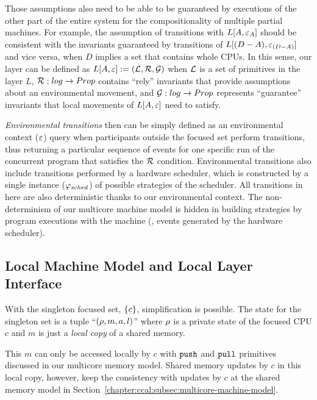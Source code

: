 Those assumptions  also need to be able to be guaranteed by executions of the other part of the entire system for 
the compositionality of multiple partial machines.
For example, the assumption of transitions with $L[A, {\varepsilon}_{A}]$ should be consistent with the invariants guaranteed by transitions of $L[(D - A), {\varepsilon}_{(D-A)}]$ and vice versa, when $D$ implies a set that contains whole CPUs.
In this sense, our layer can be defined as
$L[A, {\varepsilon}] := (\mathcal{L}, \mathcal{R},\mathcal{G})$ when $\mathcal{L}$ is a set of primitives in the layer $L$,
$\mathcal{R} : log \rightarrow Prop$ contains  ``rely'' invariants that provide assumptions about an environmental movement,
and $\mathcal{G}: log \rightarrow Prop$ represents ``guarantee'' invariants that local movements of $L[A, {\varepsilon}]$ need to satisfy.

\emph{Environmental transitions} then can be simply defined as 
an environmental context (${\varepsilon}$) query when participants outside  the focused set perform transitions,
thus returning a particular sequence of events for one specific run of the concurrent program 
that satisfies the $\mathcal{R}$ condition.
Environmental transitions also include  transitions performed by 
a hardware scheduler, which is constructed by 
a single instance ($\varphi_{sched}$) of possible strategies of the scheduler.
All transitions in here are also deterministic thanks to our environmental context.
The non-determinism of our multicore machine model is hidden in building strategies by
program executions with the machine (\eg, events generated by the hardware scheduler).

\subsection{Local Machine Model and Local Layer Interface}
\label{chapter:ccal:subsec:local-layer-interface}

With the singleton focused set, $\{c\}$, 
simplification is possible.
The state for the singleton set is a tuple ``$(\rho, m, a, l)$''
where $\rho$ is a private state of the focused CPU $c$
and $m$ is just a \emph{local copy} of a shared memory.


This $m$ can only be accessed locally by $c$ with  ${\mathrm{\texttt{push}}}$ and ${\mathrm{\texttt{pull}}}$ primitives discussed in our multicore memory model. 
Shared  memory updates by $c$ in this local copy, however, 
keep the consistency with 
 updates by $c$ at the shared memory model in
Section~\ref{chapter:ccal:subsec:multicore-machine-model}.


